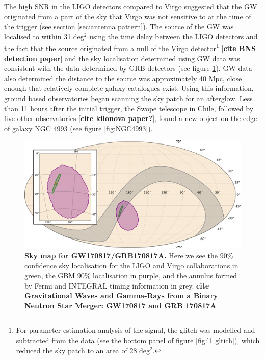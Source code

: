 \documentclass[11pt]{cuthesis}
\begin{document}
The high SNR in the LIGO detectors compared to Virgo suggested that the GW originated from a part of the sky that Virgo was not sensitive to at the time of the trigger (see section \ref{sec:antenna pattern}). The source of the GW was localised to within 31 deg$^2$ using the time delay between the LIGO detectors and the fact that the source originated from a null of the Virgo detector\footnote{For parameter estimation analysis of the signal, the glitch was modelled and subtracted from the data (see the bottom panel of figure \ref{fig:l1 gltich}), which reduced the sky patch to an area of 28 deg$^2$.} [\textbf{cite BNS detection paper}] and the sky localisation determined using GW data was consistent with the data determined by GRB detectors (see figure \ref{fig:170817 skymap}). GW data also determined the distance to the source was approximately 40 Mpc, close enough that relatively complete galaxy catalogues exist. Using this information, ground based observatories began scanning the sky patch for an afterglow. Less than 11 hours after the initial trigger, the Swope telescope in Chile, followed by five other observatories  [\textbf{cite kilonova paper?}], found a new object on the edge of galaxy NGC 4993 (see figure \ref{fig:NGC4993}). 


\begin{figure} %
\begin{center}
\includegraphics[width=0.8\linewidth]{gw-grb-170817-sky-map.jpg}
\end{center}
\caption{\textbf{Sky map for GW170817/GRB170817A.} Here we see the 90\% confidence sky localisation for the LIGO and Virgo collaborations in green, the GBM 90\% localisation in purple, and the annulus formed by Fermi and INTEGRAL timing information in grey.  \textbf{cite Gravitational Waves and Gamma-Rays from a Binary Neutron Star Merger: GW170817 and GRB 170817A} }
\label{fig:170817 skymap}
\end{figure}
\end{document}
